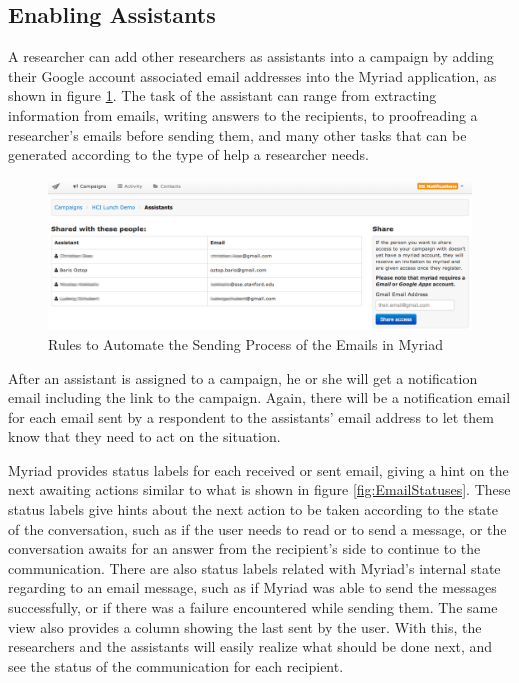 \subsection{Enabling Assistants}
\label{subsec:5.2.6:EnabAssi}

A researcher can add other researchers as assistants into a campaign by adding their Google account associated email addresses into the Myriad application, as shown in figure \ref{fig:AddAssistants}. The task of the assistant can range from extracting information from emails, writing answers to the recipients, to proofreading a researcher's emails before sending them, and many other tasks that can be generated according to the type of help a researcher needs.

\clearpage

\begin{figure}[htbp]
	\centering
	\includegraphics[width=1.00\textwidth]{imgs/AddAssistants.png}
	\caption[Rules to Automate the Sending Process of the Emails in Myriad]{Rules to Automate the Sending Process of the Emails in Myriad}
	\label{fig:AddAssistants}
\end{figure}

After an assistant is assigned to a campaign, he or she will get a notification email including the link to the campaign. Again, there will be a notification email for each email sent by a respondent to the assistants' email address to let them know that they need to act on the situation.
\vspace{1cm}

Myriad provides status labels for each received or sent email, giving a hint on the next awaiting actions similar to what is shown in figure \ref{fig:EmailStatuses}. These status labels give hints about the next action to be taken according to the state of the conversation, such as if the user needs to read or to send a message, or the conversation awaits for an answer from the recipient's side to continue to the communication. There are also status labels related with Myriad's internal state regarding to an email message, such as if Myriad was able to send the messages successfully, or if there was a failure encountered while sending them. The same view also provides a column showing the last sent by the user. With this, the researchers and the assistants will easily realize what should be done next, and see the status of the communication for each recipient. 

